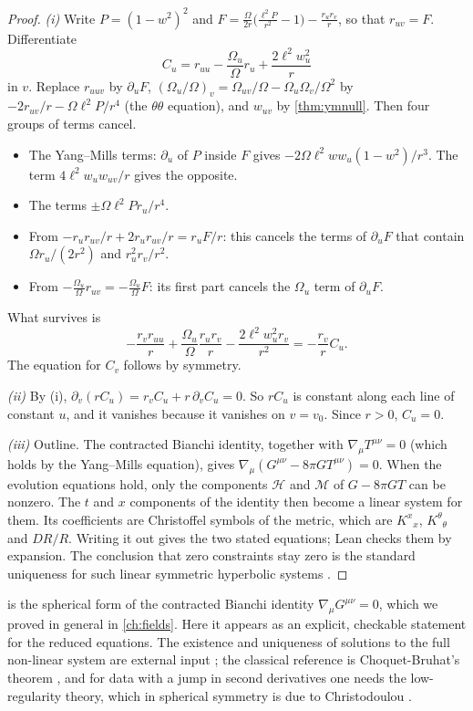 \begin{proof}
\emph{(i)} Write $P=(1-w^2)^2$ and $F=\frac\Omega{2r}\bigl(\frac{\ell^2P}{r^2}-1\bigr)-\frac{r_ur_v}r$, so that $r_{uv}=F$. Differentiate
\[
C_u=r_{uu}-\frac{\Omega_u}\Omega r_u+\frac{2\ell^2w_u^2}r
\]
in $v$. Replace $r_{uuv}$ by $\partial_uF$, $(\Omega_u/\Omega)_v=\Omega_{uv}/\Omega-\Omega_u\Omega_v/\Omega^2$ by $-2r_{uv}/r-\Omega\ell^2P/r^4$ (the $\theta\theta$ equation), and $w_{uv}$ by \cref{thm:ymnull}. Then four groups of terms cancel.
\begin{itemize}[nosep]
\item The Yang--Mills terms: $\partial_u$ of $P$ inside $F$ gives $-2\Omega\ell^2ww_u(1-w^2)/r^3$. The term $4\ell^2w_uw_{uv}/r$ gives the opposite.
\item The terms $\pm\Omega\ell^2Pr_u/r^4$.
\item From $-r_ur_{uv}/r+2r_ur_{uv}/r=r_uF/r$: this cancels the terms of $\partial_uF$ that contain $\Omega r_u/(2r^2)$ and $r_u^2r_v/r^2$.
\item From $-\frac{\Omega_u}\Omega r_{uv}=-\frac{\Omega_u}\Omega F$: its first part cancels the $\Omega_u$ term of $\partial_uF$.
\end{itemize}
What survives is
\[
-\frac{r_vr_{uu}}r+\frac{\Omega_u}\Omega\frac{r_ur_v}r-\frac{2\ell^2w_u^2r_v}{r^2}=-\frac{r_v}rC_u .
\]
The equation for $C_v$ follows by symmetry.

\emph{(ii)} By (i), $\partial_v(rC_u)=r_vC_u+r\,\partial_vC_u=0$. So $rC_u$ is constant along each line of constant $u$, and it vanishes because it vanishes on $v=v_0$. Since $r>0$, $C_u=0$.

\emph{(iii)} Outline. The contracted Bianchi identity, together with $\nabla_\mu T^{\mu\nu}=0$ (which holds by the Yang--Mills equation), gives $\nabla_\mu(G^{\mu\nu}-8\pi GT^{\mu\nu})=0$. When the evolution equations hold, only the components $\mathcal H$ and $\mathcal M$ of $G-8\pi GT$ can be nonzero. The $t$ and $x$ components of the identity then become a linear system for them. Its coefficients are Christoffel symbols of the metric, which are $K^x{}_x$, $K^\theta{}_\theta$ and $DR/R$. Writing it out gives the two stated equations; Lean checks them by expansion. The conclusion that zero constraints stay zero is the standard uniqueness for such linear symmetric hyperbolic systems \ext.
\end{proof}


 is the spherical form of the contracted Bianchi identity $\nabla_\mu G^{\mu\nu}=0$, which we proved in general in \cref{ch:fields}. Here it appears as an explicit, checkable statement for the reduced equations. The existence and uniqueness of solutions to the full non-linear system are external input \ext; the classical reference is Choquet-Bruhat's theorem \cite{ChoquetBruhat1952}, and for data with a jump in second derivatives one needs the low-regularity theory, which in spherical symmetry is due to Christodoulou \cite{Christodoulou1993}.

